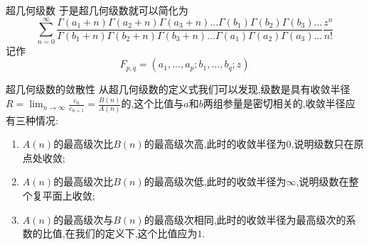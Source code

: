 \documentclass[zihao=-4,a4paper]{ctexart}
\begin{document}
\begin{mdefinition}{超几何级数}
	于是超几何级数就可以简化为
	\begin{equation}
		\sum^{\infty}_{n=0} \frac{ {\Gamma} { \left( {a}_{1} + {n} \right) } {\Gamma} { \left( {a}_{2} + {n} \right) } {\Gamma} { \left( {a}_{3} + {n} \right) } ... {\Gamma} { \left( {b}_{1} \right) } {\Gamma} { { \left( {b}_{2} \right) } } {\Gamma} { { \left( {b}_{3} \right) } } ... } { {\Gamma} { \left( {b}_{1} + {n} \right) } {\Gamma} { \left( {b}_{2} + {n} \right) } {\Gamma} { \left( {b}_{3} + {n} \right) } ... {\Gamma} { \left( {a}_{1} \right) } {\Gamma} { { \left( {a}_{2} \right) } } {\Gamma} { { \left( {a}_{3} \right) } } ... } \frac{ {z}^{n} }{ {n} ! }
	\end{equation}
	记作
	\begin{equation}
		{F}_{ {p} , {q} } = \left( {a}_{1} , ... , {a}_{p} ; {b}_{1} , ... , {b}_{q} ; {z} \right)
	\end{equation}
\end{mdefinition}

\begin{mtheorem}{超几何级数的敛散性}
	从超几何级数的定义式我们可以发现,级数是具有收敛半径$ {R} = \lim_{ {n} {\to} {\infty} } \frac{ {c}_{n} }{ {c}_{n+1} } = \frac{ {B} \left( {n} \right) }{ {A} \left( {n} \right) } $的,这个比值与$ {a} $和$ {b} $两组参量是密切相关的,收敛半径应有三种情况:
	\begin{enumerate}
		\item $ {A} \left( {n} \right) $的最高级次比$ {B} \left( {n} \right) $的最高级次高,此时的收敛半径为$0$,说明级数只在原点处收敛;
		\item $ {A} \left( {n} \right) $的最高级次比$ {B} \left( {n} \right) $的最高级次低,此时的收敛半径为$ {\infty} $,说明级数在整个复平面上收敛;
		\item $ {A} \left( {n} \right) $的最高级次与$ {B} \left( {n} \right) $的最高级次相同,此时的收敛半径为最高级次的系数的比值,在我们的定义下,这个比值应为$1$.
	\end{enumerate}
\end{mtheorem}
\end{document}
